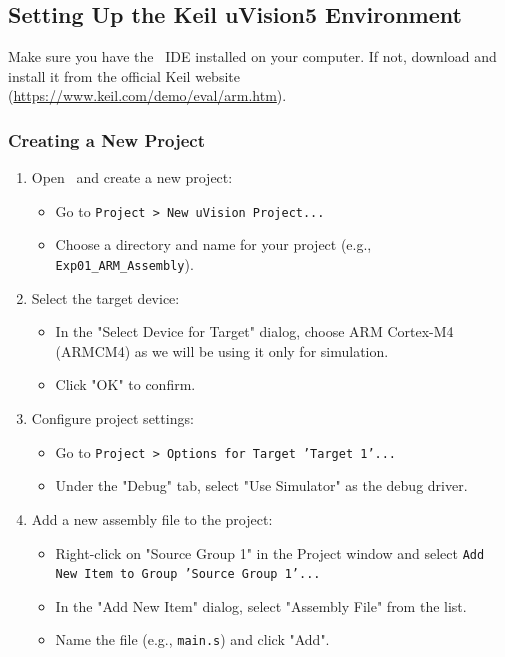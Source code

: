 \subsection{Setting Up the Keil uVision5 Environment}
Make sure you have the \keil\ IDE installed on your computer. If not, download and install it from the official Keil website (\url{https://www.keil.com/demo/eval/arm.htm}). 
\subsubsection{Creating a New Project}
\begin{enumerate}[nosep]
    \item Open \keil\ and create a new project:
    \begin{itemize}[nosep]
        \item Go to \texttt{Project > New uVision Project...}
        \item Choose a directory and name for your project (e.g., \texttt{Exp01\_ARM\_Assembly}).
    \end{itemize}
    \item Select the target device:
    \begin{itemize}[nosep]
        \item In the "Select Device for Target" dialog, choose ARM Cortex-M4 (ARMCM4) as we will be using it only for simulation.
        \item Click "OK" to confirm.
    \end{itemize}
    \item Configure project settings:
    \begin{itemize}[nosep]
        \item Go to \texttt{Project > Options for Target 'Target 1'...}
        \item Under the "Debug" tab, select "Use Simulator" as the debug driver.
    \end{itemize}
    \item Add a new assembly file to the project:
    \begin{itemize}[nosep]
        \item Right-click on "Source Group 1" in the Project window and select \texttt{Add New Item to Group 'Source Group 1'...}
        \item In the "Add New Item" dialog, select "Assembly File" from the list.
        \item Name the file (e.g., \texttt{main.s}) and click "Add".
    \end{itemize}

\end{enumerate}

